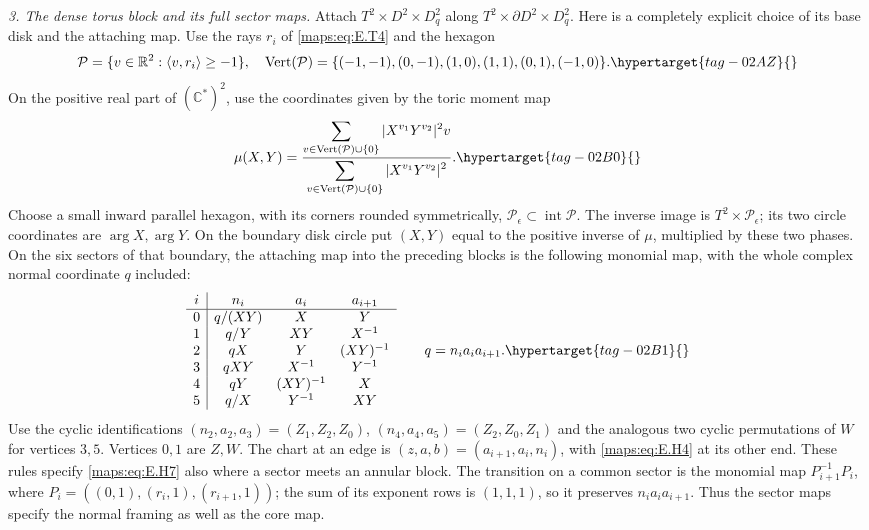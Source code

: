 \begin{theorem}
\emph{3. The dense torus block and its full sector maps.}
Attach $T^2\times D^2\times D^2_q$ along
$T^2\times\partial D^2\times D^2_q$.  Here is a completely explicit
choice of its base disk and the attaching map.  Use the rays
$r_i$ of \eqref{maps:eq:E.T4} and the hexagon
\begin{equation}
 \mathcal P=\{v\in\mathbb R^2:\langle v,r_i\rangle\geq-1\},
 \quad
 \operatorname{Vert}(\mathcal P)=
 \{(-1,-1),(0,-1),(1,0),(1,1),(0,1),(-1,0)\}.
 \hypertarget{tag-02AZ}{}\label{maps:eq:E.H5}
\end{equation}
On the positive real part of $(\mathbb C^*)^2$, use the coordinates
given by the toric moment map
\begin{equation}
 \mu(X,Y)=
 \frac{\displaystyle\sum_{v\in\operatorname{Vert}(\mathcal P)\cup\{0\}}
                 |X^{v_1}Y^{v_2}|^2v}
      {\displaystyle\sum_{v\in\operatorname{Vert}(\mathcal P)\cup\{0\}}
                 |X^{v_1}Y^{v_2}|^2}.
 \hypertarget{tag-02B0}{}\label{maps:eq:E.H6}
\end{equation}
Choose a small inward parallel hexagon, with its corners rounded
symmetrically, $\mathcal P_\epsilon\subset\operatorname{int}\mathcal P$.
The inverse image is $T^2\times\mathcal P_\epsilon$; its two circle
coordinates are $\arg X,\arg Y$.  On the boundary disk circle put
$(X,Y)$ equal to the positive inverse of $\mu$, multiplied by these
two phases.  On the six sectors of that boundary, the attaching
map into the preceding blocks is the following monomial map, with
the whole complex normal coordinate $q$ included:
\begin{equation}
\begin{array}{c|ccc}
 i& n_i&a_i&a_{i+1}\\ \hline
0&q/(XY)&X&Y\\
1&q/Y&XY&X^{-1}\\
2&qX&Y&(XY)^{-1}\\
3&qXY&X^{-1}&Y^{-1}\\
4&qY&(XY)^{-1}&X\\
5&q/X&Y^{-1}&XY
\end{array}
\qquad q=n_i a_i a_{i+1}.
\hypertarget{tag-02B1}{}\label{maps:eq:E.H7}
\end{equation}
Use the cyclic identifications
$(n_2,a_2,a_3)=(Z_1,Z_2,Z_0)$,
$(n_4,a_4,a_5)=(Z_2,Z_0,Z_1)$ and the analogous two cyclic
permutations of $W$ for vertices $3,5$.  Vertices $0,1$ are $Z,W$.
The chart at an edge is $(z,a,b)=(a_{i+1},a_i,n_i)$, with \eqref{maps:eq:E.H4}
at its other end.  These rules specify \eqref{maps:eq:E.H7} also where a sector
meets an annular block.  The transition on a common sector is the
monomial map $P_{i+1}^{-1}P_i$, where
$P_i=((0,1),(r_i,1),(r_{i+1},1))$; the sum of its exponent rows
is $(1,1,1)$, so it preserves $n_i a_i a_{i+1}$.  Thus the sector maps specify the
normal framing as well as the core map.  


\end{theorem}

